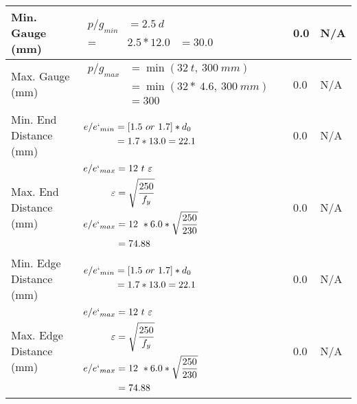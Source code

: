 \documentclass{article}%
\begin{document}
\begin{longtable}{|p{4cm}|p{5cm}|p{5.5cm}|p{1.5cm}|}
\hline%
Min. Gauge (mm)&$\begin{aligned}p/g_{min}&= 2.5 ~ d&\\ =&2.5*12.0&=30.0\end{aligned}$&0.0&N/A\\%
\hline%
Max. Gauge (mm)&$\begin{aligned}p/g_{max} &=\min(32~t,~300~mm)&\\ &=\min(32 *~4.6,~ 300 ~mm)\\&=300\end{aligned}$&0.0&N/A\\%
\hline%
Min. End Distance (mm)&$\begin{aligned}e/e`_{min} &=[1.5~or~ 1.7] * d_0\\ &=1.7*13.0=22.1 \end{aligned}$&0.0&N/A\\%
\hline%
Max. End Distance (mm)&$\begin{aligned}e/e`_{max} &= 12~ t~ \varepsilon&\\ \varepsilon &= \sqrt{\frac{250}{f_y}}\\ e/e`_{max}&=12 ~*6.0*\sqrt{\frac{250}{230}}\\ &=74.88\\ \end{aligned}$&0.0&N/A\\%
\hline%
Min. Edge Distance (mm)&$\begin{aligned}e/e`_{min} &=[1.5~or~ 1.7] * d_0\\ &=1.7*13.0=22.1 \end{aligned}$&0.0&N/A\\%
\hline%
Max. Edge Distance (mm)&$\begin{aligned}e/e`_{max} &= 12~ t~ \varepsilon&\\ \varepsilon &= \sqrt{\frac{250}{f_y}}\\ e/e`_{max}&=12 ~*6.0*\sqrt{\frac{250}{230}}\\ &=74.88\\ \end{aligned}$&0.0&N/A\\%
\hline%
\end{longtable}

%
\end{document}
